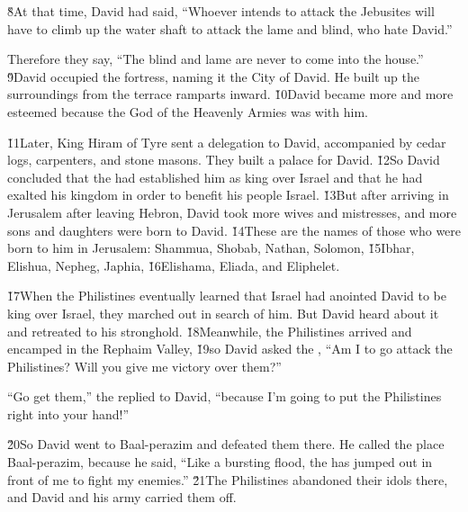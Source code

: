 \v{8}At that time, David had said, ``Whoever intends to attack the Jebusites will have to climb up the water shaft to attack the lame and blind, who hate David.''

Therefore they say, ``The blind and lame are never to come into the house.'' \v{9}David occupied the fortress, naming it the City of David. He built up the surroundings from the terrace ramparts inward. \v{10}David became more and more esteemed because the  God of the Heavenly Armies was with him.

\v{11}Later, King Hiram of Tyre sent a delegation to David, accompanied by cedar logs, carpenters, and stone masons. They built a palace for David. \v{12}So David concluded that the  had established him as king over Israel and that he had exalted his kingdom in order to benefit his people Israel. \v{13}But after arriving in Jerusalem after leaving Hebron, David took more wives and mistresses, and more sons and daughters were born to David. \v{14}These are the names of those who were born to him in Jerusalem: Shammua, Shobab, Nathan, Solomon, \v{15}Ibhar, Elishua, Nepheg, Japhia, \v{16}Elishama, Eliada, and Eliphelet.

\v{17}When the Philistines eventually learned that Israel had anointed David to be king over Israel, they marched out in search of him. But David heard about it and retreated to his stronghold. \v{18}Meanwhile, the Philistines arrived and encamped in the Rephaim Valley, \v{19}so David asked the , ``Am I to go attack the Philistines? Will you give me victory over them?''

``Go get them,'' the  replied to David, ``because I'm going to put the Philistines right into your hand!''

\v{20}So David went to Baal-perazim and defeated them there. He called the place Baal-perazim, because he said, ``Like a bursting flood, the  has jumped out in front of me to fight my enemies.'' \v{21}The Philistines abandoned their idols there, and David and his army carried them off.

